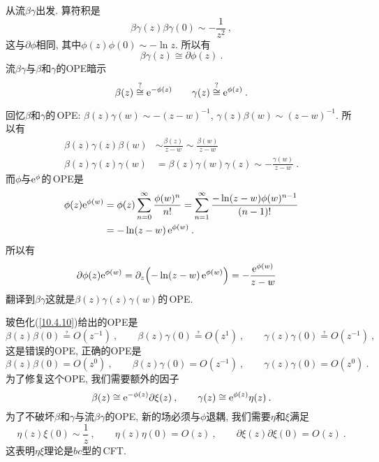 从流$ \beta\gamma $出发. 算符积是
\begin{equation}
    \beta\gamma(z)\beta\gamma(0) \sim -\frac{1}{z^{2}} \:, \label{10.4.8}
\end{equation}
这与$ \partial\phi $相同, 其中$ \phi(z)\phi(0)\sim -\ln z$. 所以有
\begin{equation}
    \beta\gamma(z)\cong \partial\phi(z)\:. \label{10.4.9}
\end{equation}
流$ \beta\gamma $与$ \beta $和$ \gamma $的OPE暗示
\begin{equation}
    \beta(z)\overset{?}{\cong} \mathrm{e}^{-\phi(z)} \qquad
    \gamma(z)\overset{?}{\cong} \mathrm{e}^{\phi(z)} \:. \label{10.4.10}
\end{equation}
\begin{tcolorbox}
    回忆$ \beta $和$ \gamma $的\,OPE: $\beta(z)\gamma(w)\sim -(z-w)^{-1}$, $\gamma(z)\beta(w)\sim(z-w)^{-1}$. 所以有
    \begin{align*}
        \beta(z)\gamma(z)\beta(w)&\sim \frac{\beta(z)}{z-w} \sim \frac{\beta(w)}{z-w} \\
        \beta(z)\gamma(z)\gamma(w)&= \beta(z)\gamma(w)\gamma(z) \sim -\frac{\gamma(w)}{z-w} \:.
    \end{align*}
    而$ \phi $与$ \mathrm{e}^{\phi} $的\,OPE是
    \begin{align*}
        \phi(z)\mathrm{e}^{\phi(w)} &=\phi(z) \sum_{n=0}^{\infty}\frac{\phi(w)^{n}}{n!}=
        \sum_{n=1}^{\infty}\frac{-\ln(z-w)\phi(w)^{n-1}}{(n-1)!}\\
        &=-\ln(z-w)\,\mathrm{e}^{\phi(w)} \:.
    \end{align*}
    所以有
    \begin{align*}
       \partial\phi(z)\mathrm{e}^{\phi(w)}& =\partial_{z} \Bigl(-\ln(z-w)\,\mathrm{e}^{\phi(w)}\Bigr) = -\frac{\mathrm{e}^{\phi(w)}}{z-w}
    \end{align*}
    翻译到$ \beta\gamma $这就是$ \beta(z)\gamma(z)\gamma(w) $的\,OPE.
\end{tcolorbox}
\noindent 玻色化(\ref{10.4.10})给出的OPE是
\begin{equation}
    \beta(z)\beta(0) \questeq O(z^{-1}) \:,\qquad 
    \beta(z)\gamma(0)\questeq O(z^{1}) \:, \qquad
    \gamma(z)\gamma(0) \questeq O(z^{-1}) \:, \label{10.4.11}
\end{equation}
这是错误的OPE, 正确的OPE是
\begin{equation}
    \beta(z)\beta(0) = O(z^{0}) \:,\qquad 
    \beta(z)\gamma(0)= O(z^{-1}) \:, \qquad
    \gamma(z)\gamma(0) = O(z^{0}) \:. \label{10.4.12}
\end{equation}
为了修复这个OPE, 我们需要额外的因子
\begin{equation}
    \beta(z)\cong \mathrm{e}^{-\phi(z)} \partial\xi(z) \:, \qquad \gamma(z)\cong\mathrm{e}^{\phi(z)}\eta(z)\:. \label{10.4.13}
\end{equation}
为了不破坏$\beta$和$\gamma$与流$\beta\gamma$的OPE, 新的场必须与$\phi$退耦, 我们需要$\eta$和$\xi$满足
\begin{equation}
    \eta(z)\xi(0) \sim \frac{1}{z} \:, \qquad 
    \eta(z)\eta(0) = O(z) \:, \qquad 
    \partial\xi(z)\partial\xi(0) =O(z) \:. \label{10.4.14}
\end{equation}
这表明$ \eta\xi $理论是$ bc $型的\,CFT.

